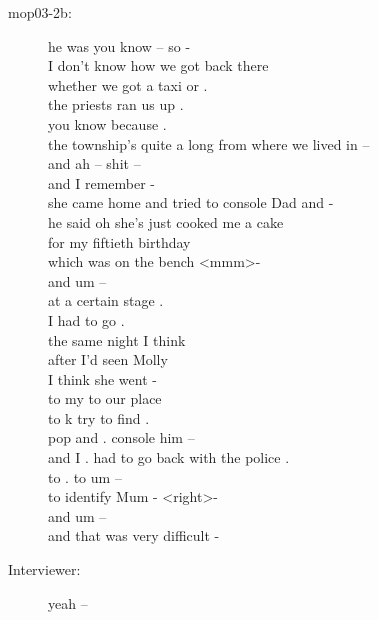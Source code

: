 \documentclass{article}
\newcommand{\turn}[2]{
\item[#1:] #2
}
\begin{document}
\begin{description}
\turn{mop03-2b}{he was you know -- so -\\
I don't know how we got back there\\
whether we got a taxi or .\\
the priests ran us up .\\
you know because .\\
the township's quite a long from where we lived in --\\
and ah -- shit --\\
and I remember -\\
she came home and tried to console Dad and -\\
he said oh she's just cooked me a cake\\
for my fiftieth birthday\\
which was on the bench \textless mmm\textgreater  -\\
and um --\\
at a certain stage .\\
I had to go .\\
the same night I think\\
after I'd seen Molly\\
I think she went -\\
to my to our place\\
to k try to find .\\
pop and . console him --\\
and I . had to go back with the police .\\
to . to um --\\
to identify Mum - \textless right\textgreater  -\\
and um --\\
and that was very difficult -}

\turn{Interviewer}{yeah --}


\end{description}
\end{document}
